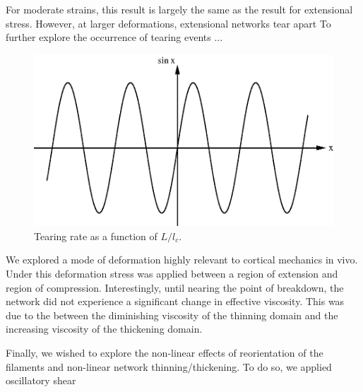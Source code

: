 \documentclass[pre,reprint]{revtex4-1}
\begin{document}
For moderate strains, this result is largely the same as the result for extensional stress.  However, at larger deformations, extensional networks tear apart
To further explore the occurrence of tearing events ...

\begin{figure}[h!]
\centering
\includegraphics[scale=0.6]{sine}
\caption{\label{fig:tear}Tearing rate as a function of $L/l_c$.}
\end{figure}

We explored a mode of deformation highly relevant to cortical mechanics in vivo.  Under this deformation stress was applied between a region of extension and region of compression.  Interestingly, until nearing the point of breakdown, the network did not experience a significant change in effective viscosity.  This was due to the between the diminishing viscosity of the thinning domain and the increasing viscosity of the thickening domain.  


Finally, we wished to explore the non-linear effects of reorientation of the filaments and non-linear network thinning/thickening.  To do so, we applied oscillatory shear 
\end{document}
